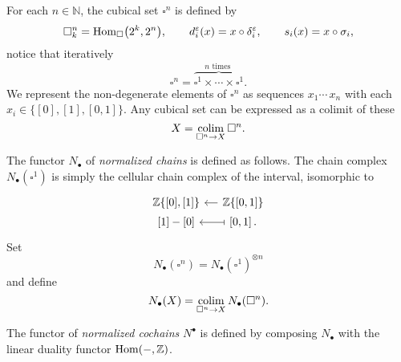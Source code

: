 For each $n \in \mathbb{N}$, the cubical set $\square^n$ is defined by
\begin{equation*}
\square^n_k  = \mathrm{Hom}_{\square} \big( 2^k, 2^n \big), \qquad 
d^\varepsilon_i(x) = x \circ \delta^\varepsilon_i, \qquad 
s_i(x) = x \circ \sigma_i,
\end{equation*}
notice that iteratively
\begin{equation*}
\square^n = \overbrace{\square^1 \times \cdots \times \square^1}^{n \text{ times }}.
\end{equation*}
We represent the non-degenerate elements of $\square^n$ as sequences $x_1 \cdots\, x_n$ with each $x_i \in \{[0], [1], [0,1]\}$. Any cubical set can be expressed as a colimit of these
\begin{equation*}
X = \operatorname*{colim}_{\square^n \to X} \square^n.
\end{equation*}

The functor $N_\bullet$ of \textit{normalized chains} is defined as follows. The chain complex $N_\bullet(\square^1)$ is simply the cellular chain complex of the interval,
isomorphic to
\begin{equation*}
\begin{tikzcd} [column sep = small, row sep = 0.1pt]
\Z\{[0], [1]\}  & \arrow[l] \Z\{[0,1]\} \\
{[1] - [0]} & \arrow[l, |->] \left[0,1\right].
\end{tikzcd}
\end{equation*}
Set
\begin{equation} \label{eq: chains on I^n}
N_\bullet(\square^n) = N_\bullet(\square^1)^{\otimes n}
\end{equation}
and define
\begin{equation*}
N_\bullet(X) = \operatorname*{colim}_{\square^n \to X} N_\bullet(\square^n).
\end{equation*}

The functor of \textit{normalized cochains} $N^\bullet$ is defined by composing $N_\bullet$ with the linear duality functor $\mathrm{Hom}(-, \mathbb{Z})$.


